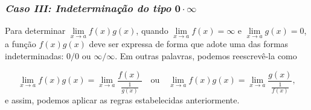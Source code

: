 \cleardoublepage\documentclass[../main.tex]{subfiles}
\begin{document}
\subsubsection*{\emph{Caso III: Indeterminação do tipo} $\mathbf{0\cdot\infty}$}
Para determinar \(\lim\limits_{x\to a}f(x)g(x)\), quando \(\lim\limits_{x\to a}f(x)=\infty\) e \(\lim\limits_{x\to a}g(x)=0\), a função \(f(x)g(x)\) deve ser expressa de forma que adote uma das formas indeterminadas: \(0/0\) ou \(\infty/\infty\). Em outras palavras, podemos reescrevê-la como

\[ \lim\limits_{x\to a}f(x)g(x)=\lim\limits_{x\to a}\dfrac{f(x)}{\frac{1}{g(x)}} \quad \mbox{ou}\quad \lim\limits_{x\to a}f(x)g(x)=\lim\limits_{x\to a}\dfrac{g(x)}{\frac{1}{f(x)}}, \]
e assim, podemos aplicar as regras estabelecidas anteriormente.\\
\end{document}
